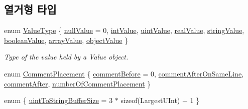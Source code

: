 \subsection*{열거형 타입}
\begin{DoxyCompactItemize}
\item 
enum \hyperlink{namespace_json_a7d654b75c16a57007925868e38212b4e}{Value\+Type} \{ \newline
\hyperlink{namespace_json_a7d654b75c16a57007925868e38212b4ea7d9899633b4409bd3fc107e6737f8391}{null\+Value} = 0, 
\hyperlink{namespace_json_a7d654b75c16a57007925868e38212b4eae5a9d708d5c9e23ae9bf98898522512d}{int\+Value}, 
\hyperlink{namespace_json_a7d654b75c16a57007925868e38212b4eaea788d9a3bb00adc6d68d97d43e1ccd3}{uint\+Value}, 
\hyperlink{namespace_json_a7d654b75c16a57007925868e38212b4eab837c7b869c14d8be712deb45c9e490e}{real\+Value}, 
\newline
\hyperlink{namespace_json_a7d654b75c16a57007925868e38212b4ea804ef857affea2d415843c73f261c258}{string\+Value}, 
\hyperlink{namespace_json_a7d654b75c16a57007925868e38212b4ea14c30dbf4da86f7b809be299f671f7fd}{boolean\+Value}, 
\hyperlink{namespace_json_a7d654b75c16a57007925868e38212b4eadc8f264f36b55b063c78126b335415f4}{array\+Value}, 
\hyperlink{namespace_json_a7d654b75c16a57007925868e38212b4eae8386dcfc36d1ae897745f7b4f77a1f6}{object\+Value}
 \}\begin{DoxyCompactList}\small\item\em Type of the value held by a Value object. \end{DoxyCompactList}
\item 
enum \hyperlink{namespace_json_a4fc417c23905b2ae9e2c47d197a45351}{Comment\+Placement} \{ \hyperlink{namespace_json_a4fc417c23905b2ae9e2c47d197a45351a52f1733775460517b2ea6bedf4906d52}{comment\+Before} = 0, 
\hyperlink{namespace_json_a4fc417c23905b2ae9e2c47d197a45351a008a230a0586de54f30b76afe70fdcfa}{comment\+After\+On\+Same\+Line}, 
\hyperlink{namespace_json_a4fc417c23905b2ae9e2c47d197a45351ac5784ca53b12250888ddb642b06aebef}{comment\+After}, 
\hyperlink{namespace_json_a4fc417c23905b2ae9e2c47d197a45351abcbd3eb00417335e094e4a03379659b5}{number\+Of\+Comment\+Placement}
 \}
\item 
enum \{ \hyperlink{namespace_json_a2aacab54ef6fc18e833fbd4982a0a23aae4f2008c7919f20d81286121d1374424}{uint\+To\+String\+Buffer\+Size} = 3 $\ast$ sizeof(Largest\+U\+Int) + 1
 \}
\end{DoxyCompactItemize}
